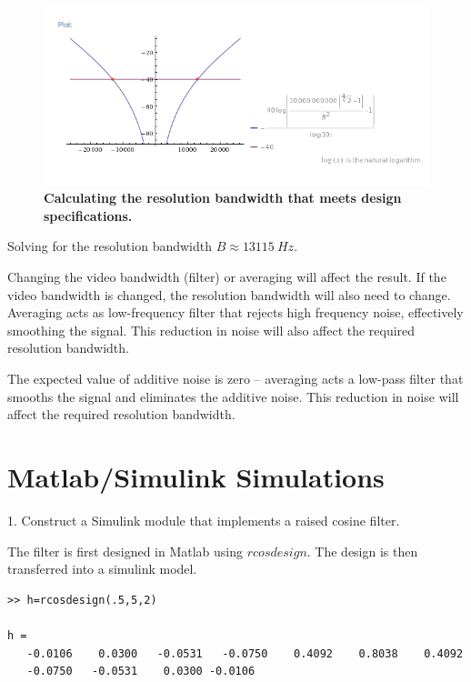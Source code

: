\documentclass[letterpaper,12pt]{article}
\begin{document}
\begin{figure}[hbtp]
\includegraphics[width=1.0\columnwidth]{prelab1-figure4}
\caption{
\label{fig:prelab1-figure4}
{\bf Calculating the resolution bandwidth that meets design specifications.
}
}
\end{figure}

Solving for the resolution bandwidth $B\approx13115\ Hz$.

Changing the video bandwidth (filter) or averaging will affect the result. If
the video bandwidth is changed, the resolution bandwidth will also need to
change. Averaging acts as low-frequency filter that rejects high frequency
noise, effectively smoothing the signal. This reduction in noise will also
affect the required resolution bandwidth.

The expected value of additive noise is zero – averaging acts a low-pass filter
that smooths the signal and eliminates the additive noise. This reduction in
noise will affect the required resolution
bandwidth.
\pagebreak

\section*{Matlab/Simulink Simulations}

1. Construct a Simulink module that implements a raised cosine filter.

The filter is first designed in Matlab using $rcosdesign$. The design is then
transferred into a simulink model.

\begin{verbatim}
>> h=rcosdesign(.5,5,2)

h =
   -0.0106    0.0300   -0.0531   -0.0750    0.4092    0.8038    0.4092
   -0.0750   -0.0531    0.0300 -0.0106
\end{verbatim}
\end{document}

